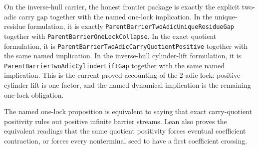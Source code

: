 \begin{theorem}
  \label{thm:collatz-two-adic-frontier-gap-and-one-lock}
  \leanok
  On the inverse-hull carrier, the honest frontier package is exactly the
  explicit two-adic carry gap together with the named one-lock implication. In
  the unique-residue formulation, it is exactly
  \texttt{ParentBarrierTwoAdicUniqueResidueGap} together with
  \texttt{ParentBarrierOneLockCollapse}. In the exact quotient formulation, it
  is \texttt{ParentBarrierTwoAdicCarryQuotientPositive} together with the same
  named implication. In the inverse-hull cylinder-lift formulation, it is
  \texttt{ParentBarrierTwoAdicCylinderLiftGap} together with the same named
  implication. This is the current proved accounting of the \(2\)-adic lock:
  positive cylinder lift is one factor, and the named dynamical implication is
  the remaining one-lock obligation.
\end{theorem}
\begin{theorem}
  \label{thm:collatz-two-adic-carry-quotient-one-lock-implication}
  \leanok
  The named one-lock proposition is equivalent to saying that exact
  carry-quotient positivity rules out positive infinite barrier streams. Lean
  also proves the equivalent readings that the same quotient positivity forces
  eventual coefficient contraction, or forces every nonterminal seed to have a
  first coefficient crossing.
\end{theorem}
